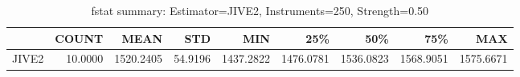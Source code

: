 \begin{table}[ht]
\centering
\caption{fstat summary: Estimator=JIVE2, Instruments=250, Strength=0.50}
\begin{tabular}{lrrrrrrrr}
\toprule
 & COUNT & MEAN & STD & MIN & 25\% & 50\% & 75\% & MAX \\
\midrule
JIVE2 & 10.0000 & 1520.2405 & 54.9196 & 1437.2822 & 1476.0781 & 1536.0823 & 1568.9051 & 1575.6671 \\
\bottomrule
\end{tabular}
\end{table}
